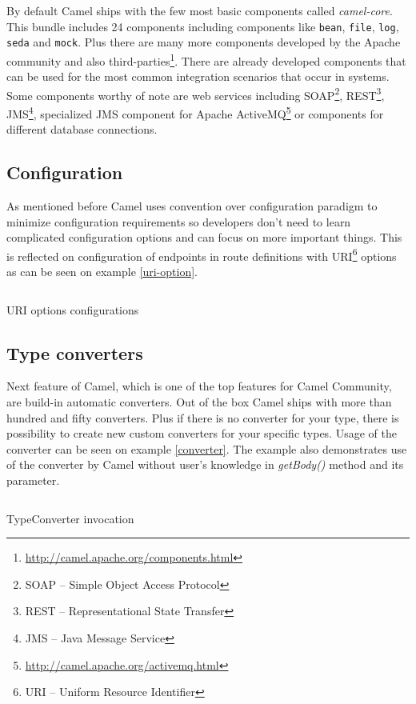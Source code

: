 \documentclass[12pt,final,oneside]{fithesis2}
\begin{document}
By default Camel ships with the few most basic components called \textit{camel-core}. This bundle includes 24 components including components like \texttt{bean}, \texttt{file}, \texttt{log}, \texttt{seda} and \texttt{mock}. Plus there are many more components developed by the Apache community and also third-parties\footnote{\url{http://camel.apache.org/components.html}}. There are already developed components that can be used for the most common integration scenarios that occur in systems. Some components worthy of note are web services including SOAP\footnote{SOAP -- Simple Object Access Protocol}, REST\footnote{REST -- Representational State Transfer}, JMS\footnote{JMS -- Java Message Service}, specialized JMS component for Apache ActiveMQ\footnote{\url{http://camel.apache.org/activemq.html}} or components for different database connections.


\subsection*{Configuration}
As mentioned before Camel uses convention over configuration paradigm to minimize configuration requirements so developers don't need to learn complicated configuration options and can focus on more important things. This is reflected on configuration of endpoints in route definitions with URI\footnote{URI -- Uniform Resource Identifier} options as can be seen on example \ref{uri-option}.
\begin{listing}[ht]
	\inputminted[]{java}{sources/uri.java}
	\caption{URI options configurations}
	\label{uri-option}
\end{listing}

\subsection*{Type converters}
Next feature of Camel, which is one of the top features for Camel Community, are build-in automatic converters. Out of the box Camel ships with more than hundred and fifty converters\cite{camel-in-action}. Plus if there is no converter for your type, there is possibility to create new custom converters for your specific types. Usage of the converter can be seen on example \ref{converter}. The example also demonstrates use of the converter by Camel without user's knowledge in \textit{getBody()} method and its parameter.

\begin{listing}[ht, p!]
	\inputminted[]{java}{sources/converter.java}
	\caption{TypeConverter invocation}
	\label{converter}
\end{listing}
\end{document}
